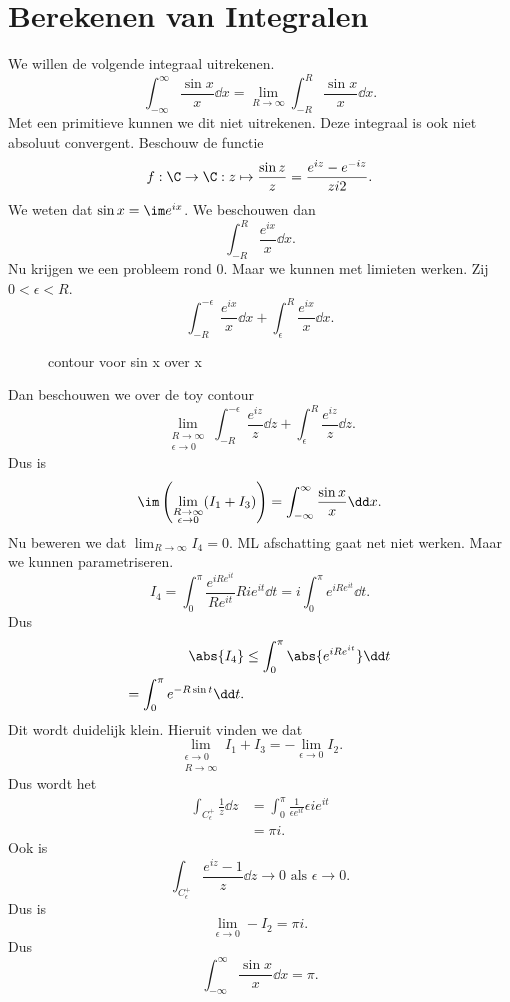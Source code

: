 \section{Berekenen van Integralen} \label{sec:berekenen_van_integralen}
We willen de volgende integraal uitrekenen.
\[
\int_{-\infty}^{\infty} \frac{\sin x}{x} \dd x = \lim_{R \to \infty} \int_{-R}^{R}\frac{\sin x}{x} \dd x
.\]
Met een primitieve kunnen we dit niet uitrekenen. Deze integraal is ook niet absoluut convergent.
Beschouw de functie \[
	f:\C\to \C: z\mapsto \frac{\sin z}{z} = \frac{e^{iz}-e^{-iz}}{z i 2}
.\] 
We weten dat  $\sin x = \im e^{ix}$. 
We beschouwen dan 
\[
\int_{-R}^{R} \frac{e^{ix}}{x} \dd x
.\] 
Nu krijgen we een probleem rond $0$. Maar we kunnen met limieten werken.
Zij $0 < \epsilon < R$. 
 \[
\int_{-R}^{-\epsilon} \frac{e^{ix}}{x }\dd x + \int_{\epsilon}^{R}\frac{e^{ix}}{x}\dd x
.\] 

\begin{figure}[ht]
    \centering
    \caption{contour voor sin x over x}
    \label{fig:contour-voor-sin-x-over-x}
\end{figure}
Dan beschouwen we over de toy contour \[
	\lim_{\substack{R \to \infty \\ \epsilon \to 0}} 
	\int_{-R}^{-\epsilon} \frac{e^{iz}}{z} \dd z + \int_{\epsilon}^{R} \frac{e^{iz}}{z} \dd z
.\] 
Dus is \[
	\im \left( \lim_{\substack{R \to \infty \\ \epsilon \to 0}} (I_1 + I_3) \right)   = \int_{-\infty}^{\infty} \frac{\sin x}{x} \dd x
.\] 
Nu beweren we dat $\lim_{R \to \infty} I_4 = 0$. 
ML afschatting gaat net niet werken. Maar we kunnen parametriseren. \[
I_4 = \int_{0}^{\pi }\frac{e^{iRe^{it}}}{Re^{it}}R i e^{it} \dd t = i \int_0^{\pi }e^{iRe^{it}} \dd t
.\] 
Dus 
\begin{align*}
	\abs{I_4} &\le \int_0^{\pi} \abs{e^{iRe^{it}}} \dd t \\
	= \int_0^{\pi} e^{-R \sin t} \dd t 
.\end{align*}
Dit wordt duidelijk klein.
Hieruit vinden we dat \[
	\lim_{\substack{\epsilon \to 0 \\ R \to \infty}} I_1 + I_3= - \lim_{\epsilon \to 0} I_2
.\] 
Dus wordt het 
\begin{align*}
	\int_{C_\epsilon^+} \frac{1}{z} \dd z &= \int_0^{\pi}\frac{1}{\epsilon e^{it}}\epsilon i e^{it} \\
	&= \pi i
.\end{align*}
Ook is \[
\int_{C_\epsilon^{+}} \frac{e^{iz}-1}{z} \dd z \to 0 \text{ als } \epsilon \to 0
.\] 
Dus is \[
\lim_{\epsilon \to 0} - I_2 = \pi i
.\] 
Dus \[
\int_{-\infty}^{\infty} \frac{\sin x}{x} \dd x = \pi
.\] 

